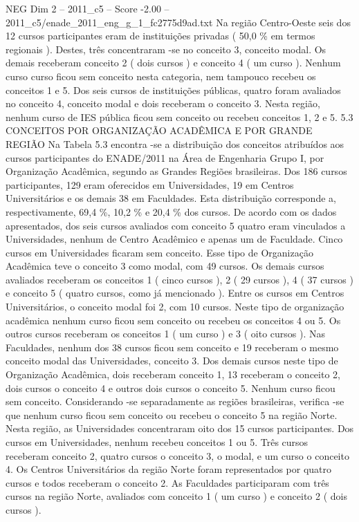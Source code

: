 \begin{textsample}{NEG Dim 2 – 2011\_c5 – Score -2.00 – 2011\_c5/enade\_2011\_eng\_g\_1\_fc2775d9ad.txt}
Na região Centro-Oeste seis dos 12 cursos participantes eram de instituições privadas ( 50,0 \% em termos regionais ).
Destes, três concentraram -se no conceito 3, conceito modal.
Os demais receberam conceito 2 ( dois cursos ) e conceito 4 ( um curso ).
Nenhum curso curso ficou sem conceito nesta categoria, nem tampouco recebeu os conceitos 1 e 5.
Dos seis cursos de instituições públicas, quatro foram avaliados no conceito 4, conceito modal e dois receberam o conceito 3.
Nesta região, nenhum curso de IES pública ficou sem conceito ou recebeu conceitos 1, 2 e 5. 5.3 CONCEITOS POR ORGANIZAÇÃO ACADÊMICA E POR GRANDE REGIÃO Na Tabela 5.3 encontra -se a distribuição dos conceitos atribuídos aos cursos participantes do ENADE/2011 na Área de Engenharia Grupo I, por Organização Acadêmica, segundo as Grandes Regiões brasileiras.
Dos 186 cursos participantes, 129 eram oferecidos em Universidades, 19 em Centros Universitários e os demais 38 em Faculdades.
Esta distribuição corresponde a, respectivamente, 69,4 \%, 10,2 \% e 20,4 \% dos cursos.
De acordo com os dados apresentados, dos seis cursos avaliados com conceito 5 quatro eram vinculados a Universidades, nenhum de Centro Acadêmico e apenas um de Faculdade.
Cinco cursos em Universidades ficaram sem conceito.
Esse tipo de Organização Acadêmica teve o conceito 3 como modal, com 49 cursos.
Os demais cursos avaliados receberam os conceitos 1 ( cinco cursos ), 2 ( 29 cursos ), 4 ( 37 cursos ) e conceito 5 ( quatro cursos, como já mencionado ).
Entre os cursos em Centros Universitários, o conceito modal foi 2, com 10 cursos.
Neste tipo de organização acadêmica nenhum curso ficou sem conceito ou recebeu os conceitos 4 ou 5.
Os outros cursos receberam os conceitos 1 ( um curso ) e 3 ( oito cursos ).
Nas Faculdades, nenhum dos 38 cursos ficou sem conceito e 19 receberam o mesmo conceito modal das Universidades, conceito 3.
Dos demais cursos neste tipo de Organização Acadêmica, dois receberam conceito 1, 13 receberam o conceito 2, dois cursos o conceito 4 e outros dois cursos o conceito 5.
Nenhum curso ficou sem conceito.
Considerando -se separadamente as regiões brasileiras, verifica -se que nenhum curso ficou sem conceito ou recebeu o conceito 5 na região Norte.
Nesta região, as Universidades concentraram oito dos 15 cursos participantes.
Dos cursos em Universidades, nenhum recebeu conceitos 1 ou 5.
Três cursos receberam conceito 2, quatro cursos o conceito 3, o modal, e um curso o conceito 4.
Os Centros Universitários da região Norte foram representados por quatro cursos e todos receberam o conceito 2.
As Faculdades participaram com três cursos na região Norte, avaliados com conceito 1 ( um curso ) e conceito 2 ( dois cursos ).

\end{textsample}
